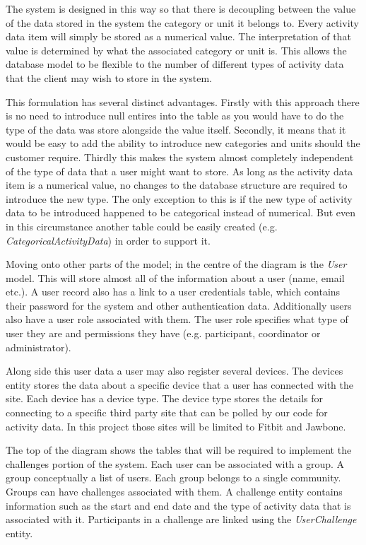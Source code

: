 The system is designed in this way so that there is decoupling between the value of the data stored in the system the category or unit it belongs to. Every activity data item will simply be stored as a numerical value. The interpretation of that value is determined by what the associated category or unit is. This allows the database model to be flexible to the number of different types of activity data that the client may wish to store in the system. 

This formulation has several distinct advantages. Firstly with this approach there is no need to introduce null entires into the table as you would have to do the type of the data was store alongside the value itself. Secondly, it means that it would be easy to add the ability to introduce new categories and units should the customer require. Thirdly this makes the system almost completely independent of the type of data that a user might want to store. As long as the activity data item is a numerical value, no changes to the database structure are required to introduce the new type. The only exception to this is if the new type of activity data to be introduced happened to be categorical instead of numerical. But even in this circumstance another table could be easily created (e.g. \textit{CategoricalActivityData}) in order to support it.

Moving onto other parts of the model; in the centre of the diagram is the \textit{User} model. This will store almost all of the information about a user (name, email etc.). A user record also has a link to a user credentials table, which contains their password for the system and other authentication data. Additionally users also have a user role associated with them. The user role specifies what type of user they are and permissions they have (e.g. participant, coordinator or administrator).

Along side this user data a user may also register several devices. The devices entity stores the data about a specific device that a user has connected with the site. Each device has a device type. The device type stores the details for connecting to a specific third party site that can be polled by our code for activity data. In this project those sites will be limited to Fitbit and Jawbone.

The top of the diagram shows the tables that will be required to implement the challenges portion of the system. Each user can be associated with a group. A group conceptually a list of users. Each group belongs to a single community. Groups can have challenges associated with them. A challenge entity contains information such as the start and end date and the type of activity data that is associated with it. Participants in a challenge are linked using the \textit{UserChallenge} entity.

